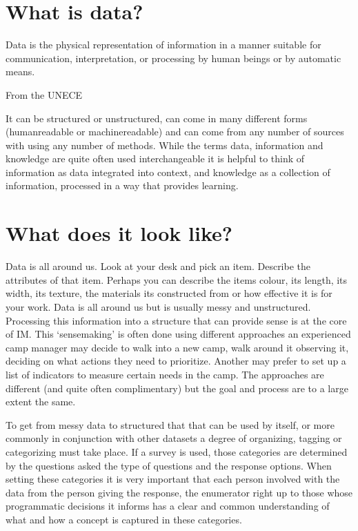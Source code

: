 \documentclass[letterpaper,10pt,english]{jupyterBook}
\begin{document}
\sphinxAtStartPar
{}


\section{What is data?}
\label{\detokenize{part1/data literacy:what-is-data}}
\sphinxAtStartPar
Data is the physical representation of information in a manner suitable for communication, interpretation, or processing by human beings or by automatic means.%
\begin{footnote}[2]\sphinxAtStartFootnote
From the UNECE 
%
\end{footnote} It can be structured or unstructured, can come in many different forms (human\sphinxhyphen{}readable or machine\sphinxhyphen{}readable) and can come from any number of sources with using any number of methods. While the terms data, information and knowledge are quite often used interchangeable it is helpful to think of information as data integrated into context, and knowledge as a collection of information, processed in a way that provides learning.


\section{What does it look like?}
\label{\detokenize{part1/data literacy:what-does-it-look-like}}
\sphinxAtStartPar
Data is all around us. Look at your desk and pick an item. Describe the attributes of that item. Perhaps you can describe the items colour, its length, its width, its texture, the materials its constructed from or how effective it is for your work. Data is all around us but is usually messy and unstructured. Processing this information into a structure that can provide sense is at the core of IM. This ‘sense\sphinxhyphen{}making’ is often done using different approaches \sphinxhyphen{} an experienced camp manager may decide to walk into a new camp, walk around it observing it, deciding on what actions they need to prioritize. Another may prefer to set up a list of indicators to measure certain needs in the camp. The approaches are different (and quite often complimentary) but the goal and process are to a large extent the same.

\sphinxAtStartPar
To get from messy data to structured that that can be used \sphinxhyphen{} by itself, or more commonly in conjunction with other datasets \sphinxhyphen{} a degree of organizing, tagging or categorizing must take place. If a survey is used, those categories are determined by the questions asked the type of questions and the response options. When setting these categories it is very important that each person involved with the data \sphinxhyphen{} from the person giving the response, the enumerator right up to those whose programmatic decisions it informs \sphinxhyphen{} has a clear and common understanding of what and how a concept is captured in these categories.
\end{document}
